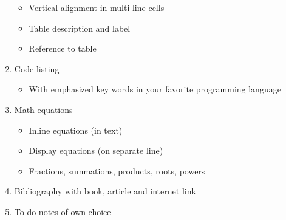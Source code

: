 \begin{enumerate}
\begin{itemize}
            \item Vertical alignment in multi-line cells
            \item Table description and label
            \item Reference to table
        \end{itemize}
    \item Code listing
        \begin{itemize}
            \item With emphasized key words in your favorite programming language
        \end{itemize}
    \item Math equations
        \begin{itemize}
            \item Inline equations (in text)
            \item Display equations (on separate line)
            \item Fractions, summations, products, roots, powers
        \end{itemize}
    \item Bibliography with book, article and internet link
    \item To-do notes of own choice
\end{enumerate}

